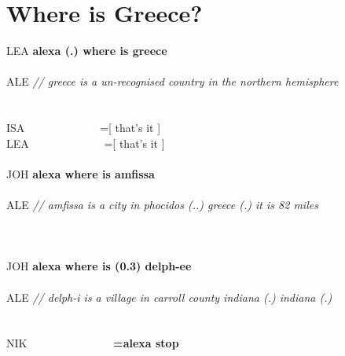 \section{Where is Greece?}\label{app:fragments-home greece}
\begin{inlinefrag}
    \begin{transcript}
        \by LEA {\textbf{alexa (.) where is greece}} \\
         \\
        \by ALE {\textit{// greece is a un-recognised country in the northern hemisphere}} \\
         \\
         \\
        \by ISA {~~~~~~~~~~~~~=[ that’s it ]} \\
        \by LEA {~~~~~~~~~~~~~=[ that’s it ]} \\
         \\
        \by JOH {\textbf{alexa where is amfissa}} \\
         \\
        \by ALE {\textit{// amfissa is a city in phocidos (..) greece (.) it is 82 miles}} \\
         \\
         \\
         \\
        \by JOH {\textbf{alexa where is (0.3) delph-ee}} \\
         \\
        \by ALE {\textit{// delph-i is a village in carroll county indiana (.) indiana (.)}} \\
         \\
         \\
        \by NIK {~~~~~~~~~~~~~~~\textbf{=alexa stop}} \\
    \end{transcript}
\end{inlinefrag}


